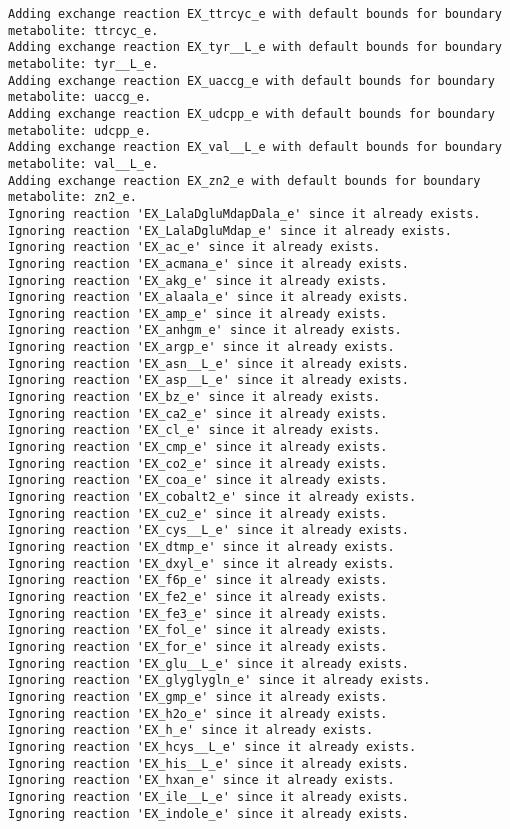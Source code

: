 \documentclass[
  letterpaper,
  DIV=11,
  numbers=noendperiod]{scrartcl}
\begin{document}
\begin{verbatim}
Adding exchange reaction EX_ttrcyc_e with default bounds for boundary metabolite: ttrcyc_e.
Adding exchange reaction EX_tyr__L_e with default bounds for boundary metabolite: tyr__L_e.
Adding exchange reaction EX_uaccg_e with default bounds for boundary metabolite: uaccg_e.
Adding exchange reaction EX_udcpp_e with default bounds for boundary metabolite: udcpp_e.
Adding exchange reaction EX_val__L_e with default bounds for boundary metabolite: val__L_e.
Adding exchange reaction EX_zn2_e with default bounds for boundary metabolite: zn2_e.
Ignoring reaction 'EX_LalaDgluMdapDala_e' since it already exists.
Ignoring reaction 'EX_LalaDgluMdap_e' since it already exists.
Ignoring reaction 'EX_ac_e' since it already exists.
Ignoring reaction 'EX_acmana_e' since it already exists.
Ignoring reaction 'EX_akg_e' since it already exists.
Ignoring reaction 'EX_alaala_e' since it already exists.
Ignoring reaction 'EX_amp_e' since it already exists.
Ignoring reaction 'EX_anhgm_e' since it already exists.
Ignoring reaction 'EX_argp_e' since it already exists.
Ignoring reaction 'EX_asn__L_e' since it already exists.
Ignoring reaction 'EX_asp__L_e' since it already exists.
Ignoring reaction 'EX_bz_e' since it already exists.
Ignoring reaction 'EX_ca2_e' since it already exists.
Ignoring reaction 'EX_cl_e' since it already exists.
Ignoring reaction 'EX_cmp_e' since it already exists.
Ignoring reaction 'EX_co2_e' since it already exists.
Ignoring reaction 'EX_coa_e' since it already exists.
Ignoring reaction 'EX_cobalt2_e' since it already exists.
Ignoring reaction 'EX_cu2_e' since it already exists.
Ignoring reaction 'EX_cys__L_e' since it already exists.
Ignoring reaction 'EX_dtmp_e' since it already exists.
Ignoring reaction 'EX_dxyl_e' since it already exists.
Ignoring reaction 'EX_f6p_e' since it already exists.
Ignoring reaction 'EX_fe2_e' since it already exists.
Ignoring reaction 'EX_fe3_e' since it already exists.
Ignoring reaction 'EX_fol_e' since it already exists.
Ignoring reaction 'EX_for_e' since it already exists.
Ignoring reaction 'EX_glu__L_e' since it already exists.
Ignoring reaction 'EX_glyglygln_e' since it already exists.
Ignoring reaction 'EX_gmp_e' since it already exists.
Ignoring reaction 'EX_h2o_e' since it already exists.
Ignoring reaction 'EX_h_e' since it already exists.
Ignoring reaction 'EX_hcys__L_e' since it already exists.
Ignoring reaction 'EX_his__L_e' since it already exists.
Ignoring reaction 'EX_hxan_e' since it already exists.
Ignoring reaction 'EX_ile__L_e' since it already exists.
Ignoring reaction 'EX_indole_e' since it already exists.

\end{verbatim}
\end{document}
